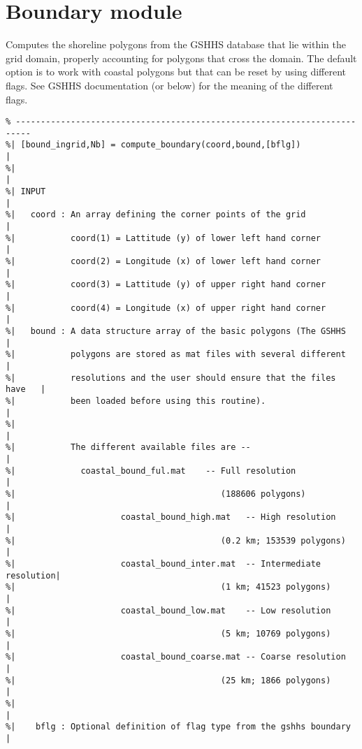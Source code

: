 \documentclass[12pt]{article}
\begin{document}
\section{Boundary module}
Computes the shoreline polygons from the GSHHS database that lie within the grid domain, properly accounting for polygons that cross the domain. The default option is to work with coastal polygons but that can be reset by using different flags. See GSHHS documentation (or below) for the meaning of the different flags.
\begin{verbatim}
% -------------------------------------------------------------------------
%| [bound_ingrid,Nb] = compute_boundary(coord,bound,[bflg])               |
%|                                                                        |
%| INPUT                                                                  |
%|   coord : An array defining the corner points of the grid              |
%|           coord(1) = Lattitude (y) of lower left hand corner           |
%|           coord(2) = Longitude (x) of lower left hand corner           |
%|           coord(3) = Lattitude (y) of upper right hand corner          |
%|           coord(4) = Longitude (x) of upper right hand corner          |
%|   bound : A data structure array of the basic polygons (The GSHHS      |
%|           polygons are stored as mat files with several different      | 
%|           resolutions and the user should ensure that the files have   |
%|           been loaded before using this routine).                      |
%|                                                                        |
%|           The different available files are --                         |
%|             coastal_bound_ful.mat    -- Full resolution                |
%|                                         (188606 polygons)              |
%|                     coastal_bound_high.mat   -- High resolution        |
%|                                         (0.2 km; 153539 polygons)      |
%|                     coastal_bound_inter.mat  -- Intermediate resolution|
%|                                         (1 km; 41523 polygons)         |
%|                     coastal_bound_low.mat    -- Low resolution         |
%|                                         (5 km; 10769 polygons)         |
%|                     coastal_bound_coarse.mat -- Coarse resolution      |
%|                                         (25 km; 1866 polygons)         |
%|                                                                        |
%|    bflg : Optional definition of flag type from the gshhs boundary     |

\end{verbatim}
\end{document}
